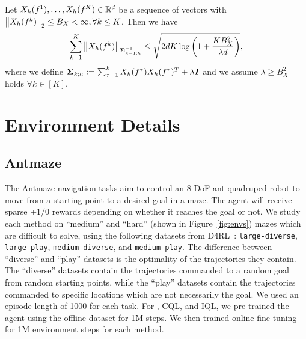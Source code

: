 \begin{lemma}
    \label{lemma:bound-inverse-cov-norm}
    Let $X_h(f^1),\dots,X_h(f^K)\in \mathbb R^d$ be a sequence of vectors with $\left\| X_h(f^k) \right\|_{2}\leq B_X<\infty,\forall k\leq K$. Then we have
    \begin{equation}
        \sum_{k=1}^K\left\| X_h(f^k) \right\|_{\boldsymbol \Sigma^{-1}_{k-1;h}}\leq\sqrt{2dK\log\left( 1+\frac{KB_X^2}{\lambda d} \right)},
    \end{equation}
    where we define $\boldsymbol \Sigma_{k;h}:=\sum_{\tau=1}^kX_h(f^\tau)X_h(f^\tau)^T+\lambda \boldsymbol I$ and we assume $\lambda\geq B_X^2$ holds $\forall k\in[K]$.
\end{lemma}


\section{Environment Details}
\label{appendix:env_details}
\subsection{Antmaze} 
The Antmaze navigation tasks aim to control an 8-DoF ant quadruped robot to move from a starting point to a desired goal in a maze. The agent will receive sparse +1/0 rewards depending on whether it reaches the goal or not. We study each method on ``medium'' and ``hard'' (shown in Figure~\ref{fig:envs}) mazes which are difficult to solve, using the following datasets from D4RL~\citep{fu2020d4rl}: \texttt{large-diverse}, \texttt{large-play}, \texttt{medium-diverse}, and \texttt{medium-play}. The difference between ``diverse'' and ``play'' datasets is the optimality of the trajectories they contain. The ``diverse'' datasets contain the trajectories commanded to a random goal from random starting points, while the ``play'' datasets contain the trajectories commanded to specific locations which are not necessarily the goal. We used an episode length of 1000 for each task. For \methodname, CQL, and IQL, we pre-trained the agent using the offline dataset for 1M steps. We then trained online fine-tuning for 1M environment steps for each method.


